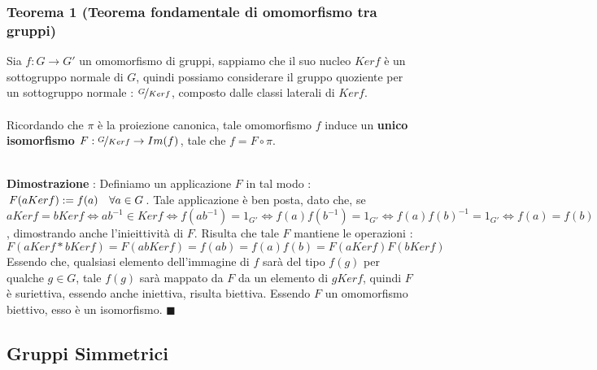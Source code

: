 \documentclass[12pt, letterpaper]{article}
\newcommand{\spaz}{{\text{\hphantom{aa}}}}
\begin{document}
 \subsubsection{Teorema 1 (Teorema fondamentale di omomorfismo tra gruppi)}
 Sia \(f:G\rightarrow G'\) un omomorfismo di gruppi, sappiamo che il suo 
 nucleo \(Kerf\) è un sottogruppo normale di \(G\), quindi possiamo considerare il gruppo quoziente 
 per un sottogruppo normale : \(\nicefrac{G}{Kerf}\), composto dalle classi laterali di \(Kerf\).\\\hphantom{}\\
 Ricordando che \(\pi\) è la proiezione canonica, tale omomorfismo 
 \(f\) induce un \textbf{unico isomorfismo} \(F:\nicefrac{G}{Kerf}\rightarrow Im(f)\), 
 tale che \(f=F \circ\pi\).
 \begin{figure}[h]
\end{figure}
\\\textbf{Dimostrazione} : Definiamo un applicazione \(F\) in tal modo : \(F(aKerf):=f(a)\spaz\forall a\in G\).
Tale applicazione è ben posta, dato che, se \(aKerf=bKerf\iff ab^{-1}\in Kerf\iff f(ab^{-1})=1_{G'}\iff f(a)f(b^{-1})=1_{G'}
\iff f(a)f(b)^{-1}=1_{G'} \iff f(a)=f(b)\), dimostrando anche l'inieittività di \(F\). Risulta che 
tale \(F\) mantiene le operazioni :$$F(aKerf*bKerf)=F(abKerf)=f(ab)=f(a)f(b)=F(aKerf)F(bKerf)$$
Essendo che, qualsiasi elemento dell'immagine di \(f\) sarà del tipo \(f(g)\) per qualche \(g\in G\), tale \(f(g)\) 
sarà mappato da \(F\) da un elemento di \(gKerf\), quindi \(F\) è suriettiva, essendo anche iniettiva, risulta 
biettiva. Essendo \(F\) un omomorfismo biettivo, esso è un isomorfismo. \(\blacksquare\)
\subsection{Gruppi Simmetrici}\label{gruppSim}
\end{document}
